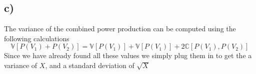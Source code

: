 \documentclass[a4paper]{article}
\begin{document}
\subsection*{c)}
The variance of the combined power production can be computed using the following calculations
\begin{equation}
    \mathbb{V}[P(V_1) + P(V_2)] = \mathbb{V}[P(V_1)] + \mathbb{V}[P(V_1)] + 2\mathbb{C}[P(V_1), P(V_2)]
\end{equation}
Since we have already found all these values we simply plug them in to get the a variance of $X$, and a standard deviation of $\sqrt{X}$
\end{document}
